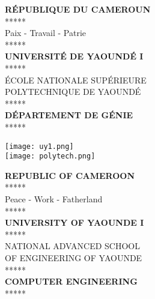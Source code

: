 \documentclass[12pt]{article}
\begin{document}
\thispagestyle{empty}


\vspace*{1.5cm}

\noindent
\begin{minipage}{0.3\linewidth}
    \begin{center}
        \textbf{RÉPUBLIQUE DU CAMEROUN}\\
        *****\\
        Paix - Travail - Patrie\\
        *****\\[0.3cm]

        \textbf{UNIVERSITÉ DE YAOUNDÉ I}\\
        *****\\[0.3cm]

        ÉCOLE NATIONALE SUPÉRIEURE\\
        POLYTECHNIQUE DE YAOUNDÉ\\
        *****\\[0.3cm]

        \textbf{DÉPARTEMENT DE GÉNIE}\\
        ***** 
    \end{center}
\end{minipage}
\begin{minipage}{0.35\linewidth}
    \begin{center}
        \texttt{[image: uy1.png]}\\[0.5cm]
        \texttt{[image: polytech.png]}
    \end{center}
\end{minipage}
\begin{minipage}{0.3\linewidth}
    \begin{center}
        \textbf{REPUBLIC OF CAMEROON}\\
        *****\\
        Peace - Work - Fatherland\\
        *****\\[0.3cm]

        \textbf{UNIVERSITY OF YAOUNDE I}\\
        *****\\[0.3cm]

        NATIONAL ADVANCED SCHOOL\\
        OF ENGINEERING OF YAOUNDE\\
        *****\\[0.3cm]

        \textbf{COMPUTER ENGINEERING}\\
        ***** 
    \end{center}
\end{minipage}
\end{document}
